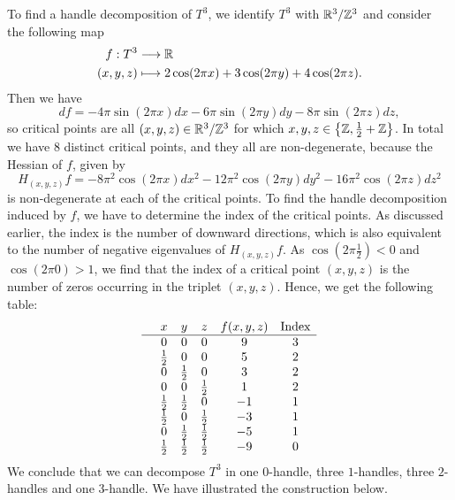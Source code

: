 \begin{eg}
\end{eg}
\begin{eg}[$T^{3} = S^{1} \times S^{1} \times S^{2}$]
    \label{eg:handle-decomposition-three-torus}
    To find a handle decomposition of $T^3$, we identify $T^{3}$ with $\mathbb{R}^3 / \mathbb{Z}^{3}$ and consider the following map
    \begin{align*}
        f: T^{3} &\longrightarrow \mathbb{R} \\
        (x, y, z) &\longmapsto 2\cos (2 \pi x) + 3\cos ( 2 \pi y) + 4 \cos(2 \pi z)
    .\end{align*}
    Then we have
    \[
        df =
        -4\pi \sin (2 \pi x) dx
        -6 \pi \sin ( 2 \pi y) dy
        - 8 \pi \sin(2 \pi z) dz
    ,\] 
    so critical points are all $(x, y, z) \in \mathbb{R}^3 / \mathbb{Z}^3$ for which  $x, y, z \in \left\{\mathbb{Z}, \frac{1}{2} + \mathbb{Z}\right\}$.
    In total we have $8$ distinct critical points, and they all are non-degenerate, because the Hessian of $f$, given by
    \[
        H_{(x, y, z)} f =
        - 8 \pi^2  \cos (2 \pi x) dx^2
        -12\pi^2 \cos ( 2 \pi y) dy^2
        -16 \pi^2 \cos(2 \pi z) dz^2
    \] 
    is non-degenerate at each of the critical points.
    To find the handle decomposition induced by $f$, we have to determine the index of the critical points.
    As discussed earlier, the index is the number of downward directions, which is also equivalent to the number of negative eigenvalues of $H_{(x, y, z)}f$.
    As $\cos(2 \pi \frac{1}{2}) < 0$ and $\cos(2 \pi 0) > 1$, we find that the index of a critical point $(x, y, z)$ is the number of zeros occurring in the triplet $(x, y, z)$. Hence, we get the following table:
    \[\begin{array}{cccccc}
  & x & y  & z & f(x, y, z) & \text{Index}\\ \hline
  & 0 & 0 & 0 & 9 & 3 \\
& \frac{1}{2} & 0 & 0 & 5 & 2 \\
& 0 & \frac{1}{2} & 0 & 3 & 2 \\
& 0 & 0 & \frac{1}{2} & 1 & 2 \\
& \frac{1}{2} & \frac{1}{2} & 0 & -1 & 1 \\
& \frac{1}{2} & 0 & \frac{1}{2} & -3 & 1 \\
& 0 & \frac{1}{2} & \frac{1}{2} & -5 & 1 \\
& \frac{1}{2} & \frac{1}{2} & \frac{1}{2} & -9 & 0 \\
    \end{array}\]
    We conclude that we can decompose $T^3$ in one $0$-handle, three $1$-handles, three $2$-handles and one $3$-handle. We have illustrated the construction below.


\end{eg}
